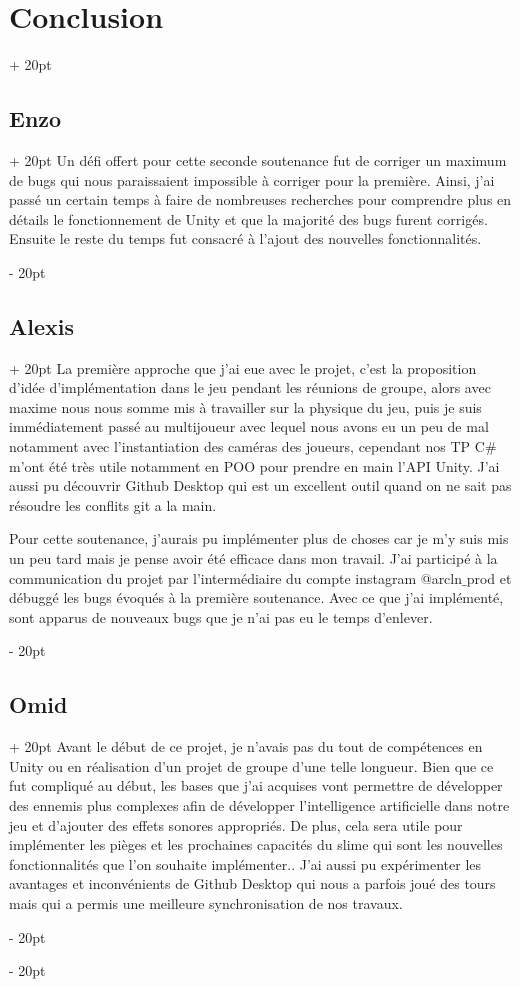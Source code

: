 \documentclass[a4paper, 12pt, twoside]{article}
\newcommand{\ind}[1][20pt]{\advance\leftskip + #1}
\newcommand{\deind}[1][20pt]{\advance\leftskip - #1}
\newenvironment{indt}[2][20pt]{#2 \par \ind[#1]}{\par \deind} %
\begin{document}
\begin{indt}{\section{Conclusion}}
\begin{indt}{\subsection{Enzo}}
            Un défi offert pour cette seconde soutenance fut de corriger un maximum de bugs qui nous paraissaient impossible à corriger pour la première. Ainsi, j'ai passé un certain temps à faire de nombreuses recherches pour comprendre plus en détails le fonctionnement de Unity et que la majorité des bugs furent corrigés. Ensuite le reste du temps fut consacré à l'ajout des nouvelles fonctionnalités.

        \end{indt}
        
        \begin{indt}{\subsection{Alexis}}
            La première approche que j'ai eue avec le projet, c'est la proposition d'idée d'implémentation dans le jeu pendant les réunions de groupe, alors avec maxime nous nous somme mis à travailler sur la physique du jeu, puis je suis immédiatement passé au multijoueur avec lequel nous avons eu un peu de mal notamment avec l'instantiation des caméras des joueurs, cependant nos TP C$\#$ m'ont été très utile notamment en POO pour prendre en main l'API Unity. J'ai aussi pu découvrir Github Desktop qui est un excellent outil quand on ne sait pas résoudre les conflits git a la main.
        
            Pour cette soutenance, j'aurais pu implémenter plus de choses car je m'y suis mis un peu tard mais je pense avoir été efficace dans mon travail. J'ai participé à la communication du projet par l'intermédiaire du compte instagram @arcln$\_$prod et débuggé les bugs évoqués à la première soutenance. Avec ce que j'ai implémenté, sont apparus de nouveaux bugs que je n'ai pas eu le temps d'enlever.
        \end{indt}

        \begin{indt}{\subsection{Omid}}
            Avant le début de ce projet, je n'avais pas du tout de compétences en Unity ou en réalisation d'un projet de groupe d'une telle longueur. Bien que ce fut compliqué au début, les bases que j'ai acquises vont permettre de développer des ennemis plus complexes afin de développer l'intelligence artificielle dans notre jeu et d'ajouter des effets sonores appropriés. De plus, cela sera utile pour implémenter les pièges et les prochaines capacités du slime qui sont les nouvelles fonctionnalités que l'on souhaite implémenter.. J'ai aussi pu expérimenter les avantages et inconvénients de Github Desktop qui nous a parfois joué des tours mais qui a permis une meilleure synchronisation de nos travaux.
        

\end{indt}
\end{indt}
\end{document}
